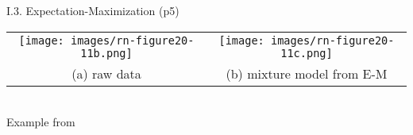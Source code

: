 \documentclass[handout]{beamer}
\begin{document}
\begin{frame}{I.3. Expectation-Maximization (p5)}
\begin{center}
\begin{tabular}{cc}
\texttt{[image: images/rn-figure20-11b.png]} &
\texttt{[image: images/rn-figure20-11c.png]} \\
(a) raw data & (b) mixture model from E-M \\
\end{tabular}\\
Example from~\cite[ch.20]{RN3:2009}
\end{center}
\end{frame}



\end{document}
